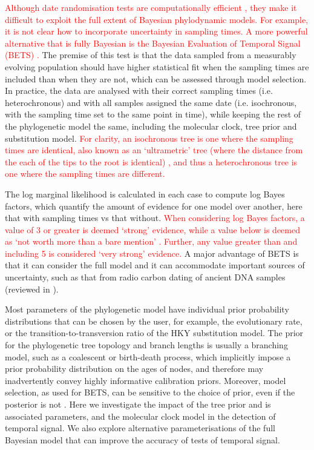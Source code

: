 \documentclass[10pt,letterpaper]{article}
\begin{document}
\textcolor{red}{Although date randomisation tests are computationally efficient \cite{duchene2018inferring}, they make it difficult to exploit the full extent of Bayesian phylodynamic models. For example, it is not clear how to incorporate uncertainty in sampling times. A more powerful alternative that is fully Bayesian is the Bayesian Evaluation of Temporal Signal (BETS) \cite{duchene2020bayesian}.} The premise of this test is that the data sampled from a measurably evolving population should have higher statistical fit when the sampling times are included than when they are not, which can be assessed through model selection. In practice, the data are analysed with their correct sampling times (i.e. heterochronous) and with all samples assigned the same date (i.e. isochronous, with the sampling time set to the same point in time), while keeping the rest of the phylogenetic model the same, including the molecular clock, tree prior and substitution model. \textcolor{red}{For clarity, an isochronous tree is one where the sampling times are identical, also known as an `ultrametric' tree (where the distance from the each of the tips to the root is identical) \cite{duchene2020bayesian, gavryushkin2016space}, and thus a heterochronous tree is one where the sampling times are different.}

The log marginal likelihood is calculated in each case to compute log Bayes factors, which quantify the amount of evidence for one model over another, here that with sampling times vs that without. \textcolor{red}{When considering log Bayes factors, a value of 3 or greater is deemed `strong' evidence, while a value below is deemed as `not worth more than a bare mention' \cite{kass1995bayes}. Further, any value greater than and including 5 is considered `very strong' evidence.} A major advantage of BETS is that it can consider the full model and it can accommodate important sources of uncertainty, such as that from radio carbon dating of ancient DNA samples \cite{molak2015empirical} (reviewed in \cite{spyrou2019ancient, duchene2020recovery}). 

Most parameters of the phylogenetic model have individual prior probability distributions that can be chosen by the user, for example, the evolutionary rate, or the transition-to-transversion ratio of the HKY substitution model. The prior for the phylogenetic tree topology and branch lengths is usually a branching model, such as a coalescent or birth-death process, which implicitly impose a prior probability distribution on the ages of nodes, and therefore may inadvertently convey highly informative calibration priors. Moreover, model selection, as used for BETS, can be sensitive to the choice of prior, even if the posterior is not \cite{gelman1995avoiding, gelman2014bayesian}. Here we investigate the impact of the tree prior and is associated parameters, and the molecular clock model in the detection of temporal signal. We also explore alternative parameterisations of the full Bayesian model that can improve the accuracy of tests of temporal signal.
\end{document}
